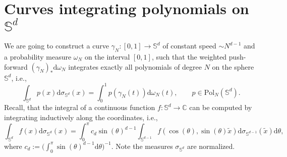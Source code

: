 \documentclass[%
a4paper,11pt,DIV=11,%
abstract=on%
]{scrartcl}
\begin{document}
\section{Curves integrating polynomials on $\mathbb S^{d}$} \label{sec:intro}

We are going to construct a curve $\gamma_{N}:[0,1]\to \mathbb S^{d}$ of constant speed $\sim N^{d-1}$ and a probability measure $\omega_{N}$ on the interval $[0,1]$, such that the weighted push-forward  $(\gamma_{N})_{*} \mathrm d \omega_{N}$ integrates exactly all polynomials of degree $N$ on the sphere $\mathbb S^{d}$, i.e.,
\begin{equation}
  \label{eq:quad_curve_Sd}
  \int_{\mathbb S^{d}} p(x) \mathrm d \sigma_{\mathbb S^{d}}(x) = \int_{0}^{1} p( \gamma_{N}(t)) \mathrm d \omega_{N}(t), \qquad p \in \mathrm{Pol}_{N}(\mathbb S^{d}). 
\end{equation}
Recall, that the integral of a continuous function $f:\mathbb S^{d}\to \mathbb C$ can be computed by integrating inductively along the coordinates, i.e.,
\[
  \int_{\mathbb S^{d}} f(x) \mathrm d \sigma_{\mathbb S^{d}}(x) = \int_{0}^{\pi} c_{d} \sin(\theta)^{d-1} \int_{\mathbb S^{d-1}} f(\cos(\theta),\sin(\theta)\tilde x) \mathrm d \sigma_{\mathbb S^{d-1}}(\tilde x)   \mathrm d \theta,
\]
where $c_{d} := \big( \int_{0}^{\pi} \sin(\theta)^{d-1} \mathrm d \theta \big)^{-1} $. Note the measures $\sigma_{\mathbb S^{d}}$ are normalized.
\end{document}
